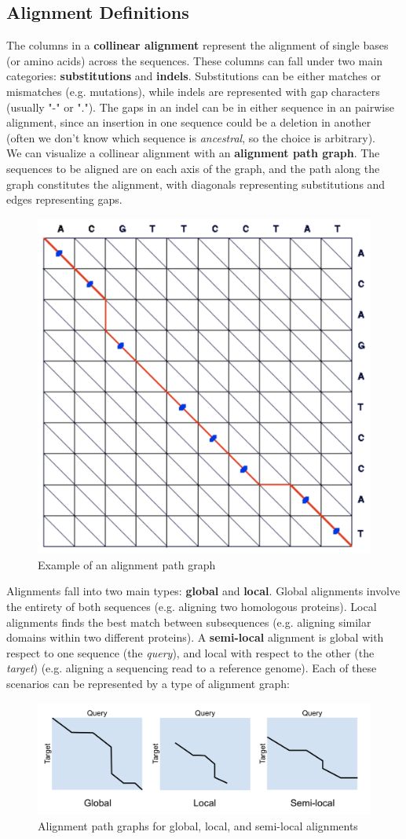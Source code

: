 \documentclass[12pt]{article}
\begin{document}
\subsection{Alignment Definitions}
The columns in a \textbf{collinear alignment} represent the alignment of single bases (or amino acids) across the sequences. These columns can fall under two main categories: \textbf{substitutions} and \textbf{indels}. Substitutions can be either matches or mismatches (e.g. mutations), while indels are represented with gap characters (usually "-" or "."). The gaps in an indel can be in either sequence in an pairwise alignment, since an insertion in one sequence could be a deletion in another (often we don't know which sequence is \textit{ancestral}, so the choice is arbitrary).\\[10pt]
We can visualize a collinear alignment with an \textbf{alignment path graph}. The sequences to be aligned are on each axis of the graph, and the path along the graph constitutes the alignment, with diagonals representing substitutions and edges representing gaps.
\begin{figure}[h]
    \centering
    \includegraphics[width=.2\linewidth]{alignment_graph.png}
    \caption{Example of an alignment path graph}
    \label{fig:align_graph}
\end{figure}

Alignments fall into two main types: \textbf{global} and \textbf{local}. Global alignments involve the entirety of both sequences (e.g. aligning two homologous proteins). Local alignments finds the best match between subsequences (e.g. aligning similar domains within two different proteins). A \textbf{semi-local} alignment is global with respect to one sequence (the \textit{query}), and local with respect to the other (the \textit{target}) (e.g. aligning a sequencing read to a reference genome). Each of these scenarios can be represented by a type of alignment graph: 
\begin{figure}[h]
    \centering
    \includegraphics[width=.8\linewidth]{Pairwise-Alignment/global_local.png}
    \caption{Alignment path graphs for global, local, and semi-local alignments}
    \label{fig:global}
\end{figure}
\end{document}
